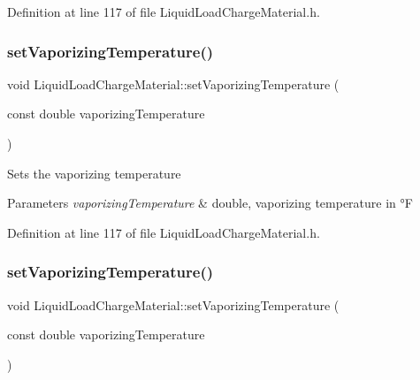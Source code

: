 Definition at line 117 of file Liquid\+Load\+Charge\+Material.\+h.

\mbox{\label{class_liquid_load_charge_material_a50938e3270de5d3c59b872f290a761cc}} 
\subsubsection{\texorpdfstring{set\+Vaporizing\+Temperature()}{setVaporizingTemperature()}\hspace{0.1cm}{\footnotesize\ttfamily [2/3]}}
{\footnotesize\ttfamily void Liquid\+Load\+Charge\+Material\+::set\+Vaporizing\+Temperature (\begin{DoxyParamCaption}\item[{const double}]{vaporizing\+Temperature }\end{DoxyParamCaption})\hspace{0.3cm}{\ttfamily [inline]}}

Sets the vaporizing temperature 
\begin{DoxyParams}{Parameters}
{\em vaporizing\+Temperature} & double, vaporizing temperature in °F \\
\hline
\end{DoxyParams}


Definition at line 117 of file Liquid\+Load\+Charge\+Material.\+h.

\mbox{\label{class_liquid_load_charge_material_a50938e3270de5d3c59b872f290a761cc}} 
\subsubsection{\texorpdfstring{set\+Vaporizing\+Temperature()}{setVaporizingTemperature()}\hspace{0.1cm}{\footnotesize\ttfamily [3/3]}}
{\footnotesize\ttfamily void Liquid\+Load\+Charge\+Material\+::set\+Vaporizing\+Temperature (\begin{DoxyParamCaption}\item[{const double}]{vaporizing\+Temperature }\end{DoxyParamCaption})\hspace{0.3cm}{\ttfamily [inline]}}

